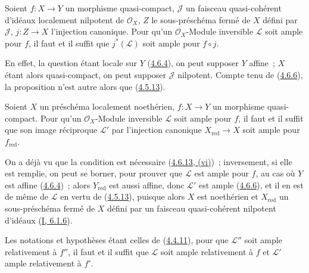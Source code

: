 \begin{proposition}[4.6.15]
\label{II.4.6.15-fr}
Soient $f:X\to Y$ un morphisme quasi-compact, $\mathcal{J}$ un faisceau
quasi-cohérent d'idéaux localement nilpotent de $\mathcal{O}_X$, $Z$ le
sous-préschéma fermé de $X$ défini par $\mathcal{J}$, $j:Z\to X$
l'injection canonique. Pour qu'un $\mathcal{O}_X$-Module inversible
$\mathcal{L}$ soit ample pour $f$, il faut et il suffit que
$j^*(\mathcal{L})$ soit ample pour $f\circ j$.
\end{proposition}

En effet, la question étant locale sur $Y$
(\hyperref[II.4.6.4-fr]{4.6.4}), on peut supposer $Y$ affine~; $X$ étant
alors quasi-compact, on peut supposer $\mathcal{J}$ nilpotent. Compte tenu
de (\hyperref[II.4.6.6-fr]{4.6.6}), la proposition n'est autre alors que
(\hyperref[II.4.5.13-fr]{4.5.13}).

\begin{corollary}[4.6.16]
\label{II.4.6.16-fr}
Soient $X$ un préschéma localement noethérien, $f:X\to Y$ un morphisme
quasi-compact. Pour qu'un $\mathcal{O}_X$-Module inversible $\mathcal{L}$
soit ample pour $f$, il faut et il suffit que son image réciproque
$\mathcal{L}'$ par l'injection canonique $X_{\mathrm{red}}\to X$ soit ample
pour $f_{\mathrm{red}}$.
\end{corollary}

On a déjà vu que la condition est nécessaire
(\hyperref[II.4.6.13-fr]{4.6.13, (vi)})~; inversement, si elle est remplie,
on peut se borner, pour prouver que $\mathcal{L}$ est ample pour $f$, au
cas où $Y$ est affine (\hyperref[II.4.6.4-fr]{4.6.4})~; alors
$Y_{\mathrm{red}}$ est aussi affine, donc $\mathcal{L}'$ est ample
(\hyperref[II.4.6.6-fr]{4.6.6}), et il en est de même de $\mathcal{L}$ en
vertu de (\hyperref[II.4.5.13-fr]{4.5.13}), puisque alors $X$ est
noethérien et $X_{\mathrm{red}}$ un sous-préschéma fermé de $X$ défini par
un faisceau quasi-cohérent nilpotent d'idéaux
(\hyperref[I.6.1.6-fr]{I, 6.1.6}).

\begin{proposition}[4.6.17]
\label{II.4.6.17-fr}
Les notations et hypothèses étant celles de
(\hyperref[II.4.4.11-fr]{4.4.11}), pour que $\mathcal{L}''$ soit ample
relativement à $f''$, il faut et il suffit que $\mathcal{L}$ soit ample
relativement à $f$ et $\mathcal{L}'$ ample relativement à $f'$.
\end{proposition}

